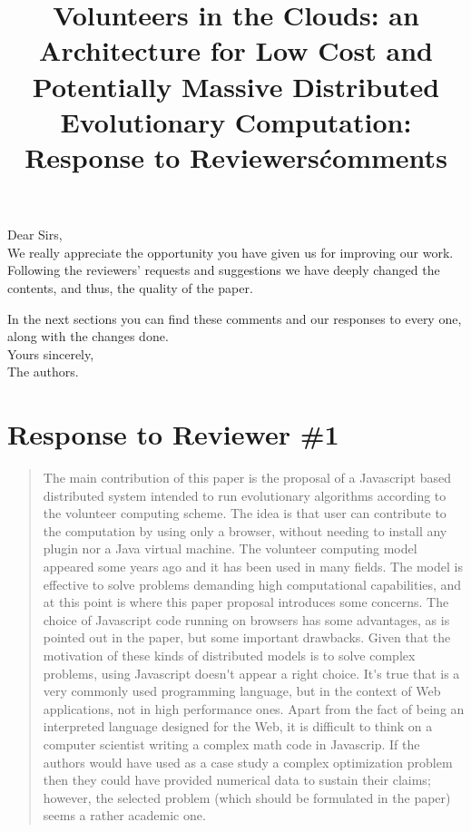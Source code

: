 \documentclass[preprint]{elsarticle}
\begin{document}

\title{Volunteers in the Clouds: an Architecture for Low Cost and
  Potentially Massive Distributed Evolutionary Computation: Response to Reviewers\' comments}

\noindent
Dear Sirs,\\

We really appreciate the opportunity you have given us for improving
our work. Following the reviewers' requests and suggestions we have
deeply changed the contents, and thus, the quality of the paper. 

In the next sections you can find these comments and our responses
to every one, along with the changes done.\\ 

\noindent
Yours sincerely,\\
The authors.

\section{Response to Reviewer \#1}

\begin{quote}
The main contribution of this paper is the proposal of a Javascript based distributed system intended to
run evolutionary algorithms according to the volunteer computing scheme. The idea is that user can
contribute to the computation by using only a browser, without needing to install any plugin nor a Java
virtual machine.
The volunteer computing model appeared some years ago and it has been used in many fields. The
model is effective to solve problems demanding high computational capabilities, and at this point is where
this paper proposal introduces some concerns. The choice of Javascript code running on browsers has
some advantages, as is pointed out in the paper, but some important drawbacks. Given that the
motivation of these kinds of distributed models is to solve complex problems, using Javascript doesn\'{}t
appear a right choice. It\'{}s true that is a very commonly used programming language, but in the context of
Web applications, not in high performance ones. Apart from the fact of being an interpreted language
designed for the Web, it is difficult to think on a computer scientist writing a complex math code in
Javascrip. If the authors would have used as a case study a complex optimization problem then they
could have provided numerical data to sustain their claims; however, the selected problem (which should
be formulated in the paper) seems a rather academic one.
\end{quote}
\end{document}
